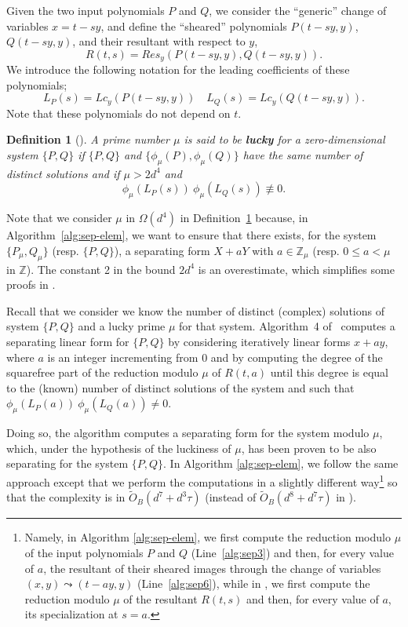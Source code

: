 \documentclass{sig-alternate}
\newtheorem{definition}[theorem]{Definition}
\newcommand {\Z}   {\mathbb Z}
\newcommand{\sOB}{\ensuremath{\widetilde{{O}}_B}}
\newcommand{\blue}[1]{\color{blue}#1\color{black}\xspace}
\renewcommand{\blue}[1]{#1\xspace}
\renewcommand{\leq}{\leqslant}  \renewcommand{\geq}{\geqslant}
\begin{document}
Given the two input polynomials $P$ and $Q$, 
we  consider the ``generic'' change of variables $x=t-sy$, and define the
 ``sheared'' polynomials $P(t-sy,y)$, $Q(t-sy,y)$,
 and their resultant with respect to $y$, 
\[{ R(t,s)}=Res_y({P}(t-sy,y),{Q}(t-sy,y)).\]
We introduce the following notation for the leading coefficients of these polynomials; 
\[L_{P}(s) = Lc_y({P}(t-sy,y))\quad L_{Q}(s) = Lc_y({Q}(t-sy,y)).\]
Note that these polynomials do not depend on $t$.



\begin{definition}[{\cite[Def. 8]{bouzidiJSC2014a}}]\label{def:lucky-nb-roots}
 A prime number $\mu$ is said to be {\em \bf lucky} for a zero-dimensional system  $\{P,Q\}$ if
 $\{P,Q\}$ and $\{\phi_\mu(P),\phi_\mu(Q)\}$ have the same  number of distinct 
solutions and if $\mu>2d^4$   and
\[\phi_\mu(L_P(s))\ \phi_\mu(L_Q(s))\not\equiv 0.\]
\end{definition}


\blue{Note that we consider $\mu$ in $\Omega(d^4)$ in Definition~\ref{def:lucky-nb-roots}  because,
in Algorithm~\ref{alg:sep-elem},  we want to ensure
that there exists, for the system $\{P_\mu,Q_\mu\}$ (resp. $\{P,Q\}$), a separating form $X+aY$ {with $a\in\Z_\mu$}
(resp. $0\leq a<\mu$ in $\Z$). The constant 2 in
the bound $2d^4$ is an overestimate, which simplifies some  proofs in \blue{\cite{bouzidiJSC2014a}}.}


Recall that we consider we know the number of distinct (complex) solutions of  system $\{P,Q\}$ and a
lucky prime $\mu$ for that system. 
Algorithm~4 
of~\blue{\cite{bouzidiJSC2014a}} 
computes a separating linear form for $\{P,Q\}$ by
considering iteratively linear forms $x+ay$, where $a$ is an integer incrementing from 0
and by  computing the degree of the squarefree part of the reduction modulo $\mu$ of $R(t,a)$ until
this degree is equal to the (known) number of distinct solutions of the system and such that
$\phi_\mu(L_P(a))\ \phi_\mu(L_Q(a))\neq 0$. 

Doing so, the algorithm computes a separating form for the system modulo $\mu$,
which, under the hypothesis of the luckiness of $\mu$, has been proven to be
also separating for the system $\{P,Q\}$.  In Algorithm \ref{alg:sep-elem}, we
follow the same approach except that we perform the computations in a slightly
different way\footnote{\small \blue{Namely, in Algorithm \ref{alg:sep-elem}, we
    first compute the reduction modulo $\mu$ of the input polynomials $P$ and
    $Q$ (Line~\ref{alg:sep3}) and then, for every value of $a$, the resultant of
    their sheared images through the change of variables $(x,y)\leadsto(t-ay,y)$
    (Line~\ref{alg:sep6}), while in \cite[Algorithm~4]{bouzidiJSC2014a}, we
    first compute the reduction modulo $\mu$ of the resultant $R(t,s)$ and then,
    for every value of $a$, its specialization at $s=a$.}} so that the
complexity is in $\sOB(d^7+d^3{\tau})$ (instead of $\sOB(d^8+d^7{\tau})$ in
\blue{\cite{bouzidiJSC2014a}}).  
\end{document}
